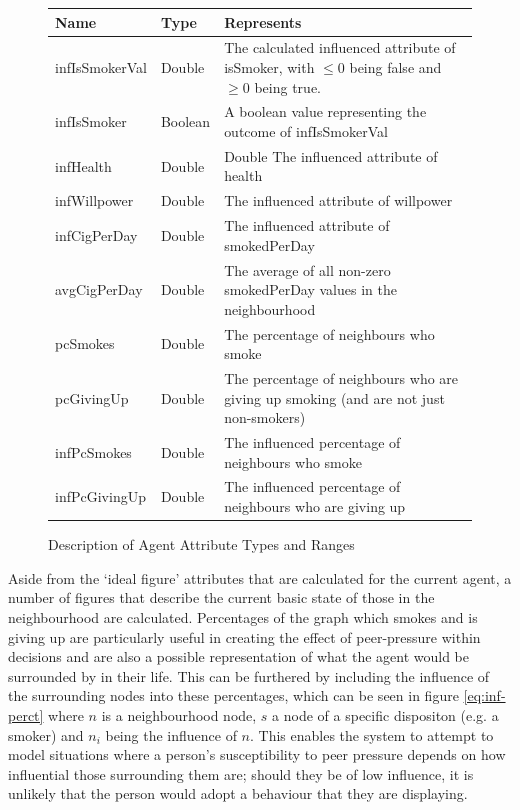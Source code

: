 \documentclass[]{report}
\begin{document}
\begin{figure}
\begin{center}
\label{tab:neighbour}
\begin{tabular}{|l||l|p{10cm}|}
\hline
\bf{Name} & \bf{Type} & \bf{Represents}\\
\hline
infIsSmokerVal 	& Double 	&	The calculated influenced attribute of isSmoker, with $\leq 0$ being false and $\geq 0$ being true.									\\
infIsSmoker			&	Boolean	&	A boolean value representing the outcome of infIsSmokerVal							\\
infHealth				&	Double	&	Double	The influenced attribute of health \\
infWillpower		&	Double	&	The influenced attribute of willpower										\\
infCigPerDay		&	Double	&	The influenced attribute of smokedPerDay						\\
avgCigPerDay		&	Double	&	The average of all non-zero smokedPerDay values in the neighbourhood				\\
pcSmokes				&	Double	&	The percentage of neighbours who smoke\\
pcGivingUp			&	Double	&	The percentage of neighbours who are giving up smoking (and are not just non-smokers)\\
infPcSmokes			&	Double	&	The influenced percentage of neighbours who smoke								\\
infPcGivingUp		&	Double	&	The influenced percentage of neighbours who are giving up							\\
\hline

\end{tabular}
\end{center}
\caption{Description of Agent Attribute Types and Ranges}
\end{figure}

Aside from the `ideal figure' attributes that are calculated for the current agent, a number of figures that describe the current basic state of those in the neighbourhood are calculated. Percentages of the graph which smokes and is giving up are particularly useful in creating the effect of peer-pressure within decisions and are also a possible representation of what the agent would be surrounded by in their life. This can be furthered by including the influence of the surrounding nodes into these percentages, which can be seen in figure \ref{eq:inf-perct} where $n$ is a neighbourhood node, $s$ a node of a specific dispositon (e.g. a smoker) and $n_{i}$ being the influence of $n$. This enables the system to attempt to model situations where a person's susceptibility to peer pressure depends on how influential those surrounding them are; should they be of low influence, it is unlikely that the person would adopt a behaviour that they are displaying.
\end{document}
